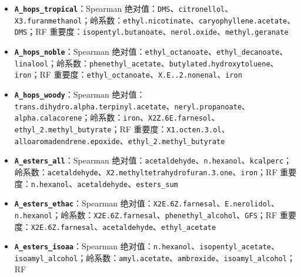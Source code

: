 \documentclass[
  11pt,
]{ctexart}
\newcounter{none} %
\begin{document}
\begin{itemize}
\item
  \textbf{\texttt{A\_\allowbreak{}hops\_\allowbreak{}tropical}}：Spearman
  绝对值：\texttt{DMS}、\texttt{citronellol}、\texttt{X3.\allowbreak{}furanmethanol}；岭系数：\texttt{ethyl.\allowbreak{}nicotinate}、\texttt{caryophyllene.\allowbreak{}acetate}、\texttt{DMS}；RF
  重要度：\texttt{isopentyl.\allowbreak{}butanoate}、\texttt{nerol.oxide}、\texttt{methyl.\allowbreak{}geranate}
\item
  \textbf{\texttt{A\_\allowbreak{}hops\_\allowbreak{}noble}}：Spearman
  绝对值：\texttt{ethyl\_\allowbreak{}octanoate}、\texttt{ethyl\_\allowbreak{}decanoate}、\texttt{linalool}；岭系数：\texttt{phenethyl\_\allowbreak{}acetate}、\texttt{butylated.\allowbreak{}hydroxytoluene}、\texttt{iron}；RF
  重要度：\texttt{ethyl\_\allowbreak{}octanoate}、\texttt{X.\allowbreak{}E.\allowbreak{}.\allowbreak{}2.\allowbreak{}nonenal}、\texttt{iron}
\item
  \textbf{\texttt{A\_\allowbreak{}hops\_\allowbreak{}woody}}：Spearman
  绝对值：\texttt{trans.\allowbreak{}dihydro.\allowbreak{}alpha.\allowbreak{}terpinyl.\allowbreak{}acetate}、\texttt{neryl.\allowbreak{}propanoate}、\texttt{alpha.\allowbreak{}calacorene}；岭系数：\texttt{iron}、\texttt{X2Z.\allowbreak{}6E.\allowbreak{}farnesol}、\texttt{ethyl\_\allowbreak{}2.\allowbreak{}methyl\_\allowbreak{}butyrate}；RF
  重要度：\texttt{X1.octen.3.ol}、\texttt{alloaromadendrene.\allowbreak{}epoxide}、\texttt{ethyl\_\allowbreak{}2.\allowbreak{}methyl\_\allowbreak{}butyrate}
\item
  \textbf{\texttt{A\_\allowbreak{}esters\_\allowbreak{}all}}：Spearman
  绝对值：\texttt{acetaldehyde}、\texttt{n.hexanol}、\texttt{kcalperc}；岭系数：\texttt{acetaldehyde}、\texttt{X2.\allowbreak{}methyltetrahydrofuran.\allowbreak{}3.\allowbreak{}one}、\texttt{iron}；RF
  重要度：\texttt{n.hexanol}、\texttt{acetaldehyde}、\texttt{esters\_sum}
\item
  \textbf{\texttt{A\_\allowbreak{}esters\_\allowbreak{}ethac}}：Spearman
  绝对值：\texttt{X2E.\allowbreak{}6Z.\allowbreak{}farnesal}、\texttt{E.nerolidol}、\texttt{n.hexanol}；岭系数：\texttt{X2E.\allowbreak{}6Z.\allowbreak{}farnesal}、\texttt{phenethyl\_\allowbreak{}alcohol}、\texttt{GFS}；RF
  重要度：\texttt{X2E.\allowbreak{}6Z.\allowbreak{}farnesal}、\texttt{acetaldehyde}、\texttt{ethyl\_\allowbreak{}acetate}
\item
  \textbf{\texttt{A\_\allowbreak{}esters\_\allowbreak{}isoaa}}：Spearman
  绝对值：\texttt{n.hexanol}、\texttt{isopentyl\_\allowbreak{}acetate}、\texttt{isoamyl\_\allowbreak{}alcohol}；岭系数：\texttt{amyl.acetate}、\texttt{ambroxide}、\texttt{isoamyl\_\allowbreak{}alcohol}；RF

\end{itemize}
\end{document}
